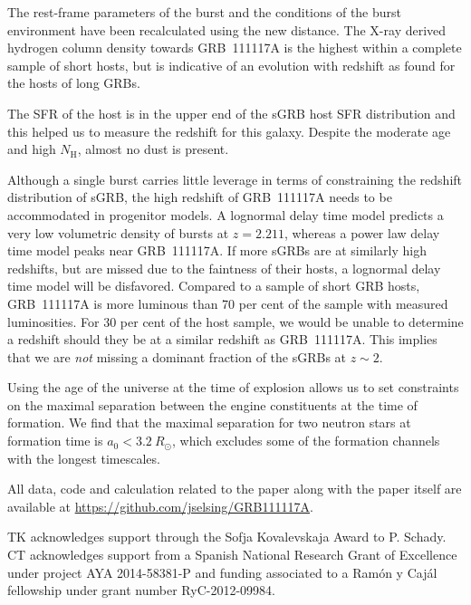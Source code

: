 \documentclass{aa}    %
\begin{document}
The rest-frame parameters of the burst and the conditions of the burst
environment have been recalculated using the new distance. The X-ray derived
hydrogen column density towards GRB~111117A is the highest within a complete
sample of short hosts, but is indicative of an evolution with redshift as found
for the hosts of long GRBs.

The SFR of the host is in the upper end of the sGRB host SFR distribution and
this helped us to measure the redshift for this galaxy. Despite
the moderate age and high $N_\mathrm{H}$, almost no dust is present.

Although a single burst carries little leverage in terms of constraining the
redshift distribution of sGRB, the high redshift of GRB~111117A needs to be
accommodated in progenitor models. A lognormal delay time model predicts a very low volumetric
density of bursts at $z = 2.211$, whereas a power law delay time model peaks
near GRB~111117A. If more sGRBs are at similarly high redshifts, but are missed due to
the faintness of their hosts, a lognormal delay time model will be disfavored.
Compared to a sample of short GRB hosts, GRB~111117A is more luminous than 70 per
cent of the sample with measured luminosities. For 30 per
cent of the host sample, we would be unable to determine a redshift should they be at 
a similar redshift as GRB~111117A. This implies that we are \textit{not} missing a dominant
fraction of the sGRBs at $z \sim 2$.

Using the age of the universe at the time of explosion allows us to set
constraints on the maximal separation between the engine constituents at the
time of formation. We find that the maximal separation for two neutron stars at
formation time is $a_0 < 3.2~R_\odot$, which excludes some of the formation
channels with the longest timescales.

All data, code and calculation related to the paper along with the
paper itself are available at \url{https://github.com/jselsing/GRB111117A}.

\begin{acknowledgements}
TK acknowledges support through the Sofja Kovalevskaja Award to P. Schady. CT acknowledges support from a Spanish National Research Grant of Excellence under project AYA 2014-58381-P and funding associated to a Ramón y Cajál fellowship under grant number RyC-2012-09984.
\end{acknowledgements}




\newpage




\end{document}
